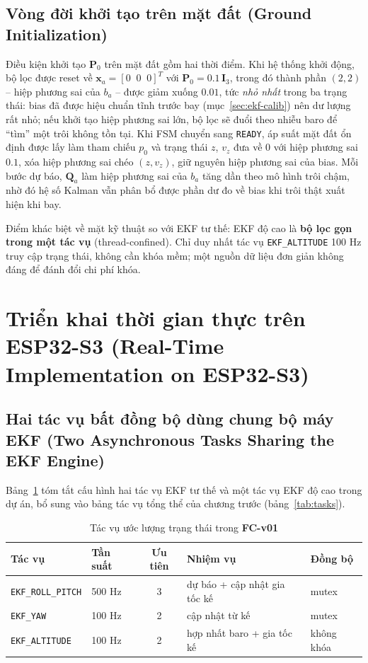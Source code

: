\subsection{Vòng đời khởi tạo trên mặt đất (Ground Initialization)}
\label{subsec:ekf-alt-init}

Điều kiện khởi tạo $\mathbf{P}_0$ trên mặt đất gồm hai thời điểm. Khi hệ thống khởi động, bộ lọc được reset về $\mathbf{x}_a = \left[0 \;\; 0 \;\; 0\right]^{T}$ với $\mathbf{P}_0 = 0.1\,\mathbf{I}_3$, trong đó thành phần $(2,2)$ -- hiệp phương sai của $b_a$ -- được giảm xuống $0.01$, tức \textit{nhỏ nhất} trong ba trạng thái: bias đã được hiệu chuẩn tĩnh trước bay (mục~\ref{sec:ekf-calib}) nên dư lượng rất nhỏ; nếu khởi tạo hiệp phương sai lớn, bộ lọc sẽ đuổi theo nhiễu baro để ``tìm'' một trôi không tồn tại. Khi FSM chuyển sang \texttt{READY}, áp suất mặt đất ổn định được lấy làm tham chiếu $p_0$ và trạng thái $z$, $v_z$ đưa về 0 với hiệp phương sai $0.1$, xóa hiệp phương sai chéo $(z, v_z)$, giữ nguyên hiệp phương sai của bias. Mỗi bước dự báo, $\mathbf{Q}_a$ làm hiệp phương sai của $b_a$ tăng dần theo mô hình trôi chậm, nhờ đó hệ số Kalman vẫn phân bổ được phần dư đo về bias khi trôi thật xuất hiện khi bay.

Điểm khác biệt về mặt kỹ thuật so với EKF tư thế: EKF độ cao là \textbf{bộ lọc gọn trong một tác vụ} (thread-confined). Chỉ duy nhất tác vụ \texttt{EKF\_ALTITUDE} 100 Hz truy cập trạng thái, không cần khóa mềm; một nguồn dữ liệu đơn giản không đáng để đánh đổi chi phí khóa.

\section{Triển khai thời gian thực trên ESP32-S3 (Real-Time Implementation on ESP32-S3)}
\label{sec:ekf-rtos}

\subsection{Hai tác vụ bất đồng bộ dùng chung bộ máy EKF (Two Asynchronous Tasks Sharing the EKF Engine)}

Bảng~\ref{tab:ekf-tasks} tóm tắt cấu hình hai tác vụ EKF tư thế và một tác vụ EKF độ cao trong dự án, bổ sung vào bảng tác vụ tổng thể của chương trước (bảng~\ref{tab:tasks}).

\begin{table}[H]
\centering
\caption{Tác vụ ước lượng trạng thái trong \textbf{FC-v01}}
\label{tab:ekf-tasks}
\small
\begin{tabular}{@{}llcll@{}}
\toprule
\textbf{Tác vụ} & \textbf{Tần suất} & \textbf{Ưu tiên} & \textbf{Nhiệm vụ} & \textbf{Đồng bộ} \\
\midrule
\texttt{EKF\_ROLL\_PITCH} & 500 Hz & 3 & dự báo + cập nhật gia tốc kế & mutex \\
\texttt{EKF\_YAW}         & 100 Hz & 2 & cập nhật từ kế               & mutex \\
\texttt{EKF\_ALTITUDE}    & 100 Hz & 2 & hợp nhất baro + gia tốc kế   & không khóa \\
\bottomrule
\end{tabular}
\end{table}

